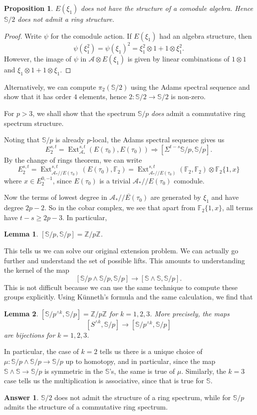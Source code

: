 \documentclass{shortart}
\newtheorem*{prop}{Proposition}
\newtheorem*{lemma}{Lemma}
\theoremstyle{definition}
\newtheorem*{ans}{Answer}
\renewcommand\S{\mathbb{S}}
\newcommand\F{\mathbb{F}}
\newcommand\Z{\mathbb{Z}}
\newcommand\qq{/\!\!/}
\DeclareMathOperator\Ext{Ext}
\begin{document}
\begin{prop}
  $E(\xi_1)$ does not have the structure of a comodule algebra. Hence $\S/2$ does not admit a ring structure.
\end{prop}

\begin{proof}
  Write $\psi$ for the comodule action. If $E(\xi_1)$ had an algebra structure, then
  \[
    \psi(\xi_1^2) = \psi(\xi_1)^2 = \xi_1^2 \otimes 1 + 1 \otimes \xi_1^2.
  \]
  However, the image of $\psi$ in $\mathcal{A} \otimes E(\xi_1)$ is given by linear combinations of $1 \otimes 1$ and $\xi_1 \otimes 1 + 1 \otimes \xi_1$.
\end{proof}

Alternatively, we can compute $\pi_2(\S/2)$ using the Adams spectral sequence and show that it has order $4$ elements, hence $2: \S/2 \to \S/2$ is non-zero.

For $p > 3$, we shall show that the spectrum $\S/p$ \emph{does} admit a commutative ring spectrum structure.

Noting that $\S/p$ is already $p$-local, the Adams spectral sequence gives us
\[
  E_2^{s, t} = \Ext^{s, t}_{\mathcal{A}_*} (E(\tau_0), E(\tau_0)) \Rightarrow [\Sigma^{t - s} \S/p, \S/p].
\]
By the change of rings theorem, we can write
\[
  E_2^{s, t} = \Ext^{s, t}_{\mathcal{A}_*\qq E(\tau_0)} (E(\tau_0), \F_2) = \Ext^{s, t}_{\mathcal{A}_*\qq E(\tau_0)} (\F_2, \F_2) \otimes \F_2\{1, x\}
\]
where $x \in E_2^{0, -1}$, since $E(\tau_0)$ is a trivial $\mathcal{A}_*\qq E(\tau_0)$ comodule.

Now the terms of lowest degree in $\overline{\mathcal{A}_*\qq E(\tau_0)}$ are generated by $\xi_1$ and have degree $2p - 2$. So in the cobar complex, we see that apart from $\F_2\{1, x\}$, all terms have $t - s \geq 2p - 3$. In particular,
\begin{lemma}
  $[\S/p, \S/p] = \Z/p\Z$.\fakeqed
\end{lemma}
This tells us we can solve our original extension problem. We can actually go further and understand the set of possible lifts. This amounts to understanding the kernel of the map
\[
  [\S/p\wedge \S/p, \S/p] \to [\S \wedge \S, \S/p].
\]
This is not difficult because we can use the same technique to compute these groups explicitly. Using K\"unneth's formula and the same calculation, we find that
\begin{lemma}
  $[\S/p^{\wedge k}, \S/p] = \Z/p\Z$ for $k = 1, 2, 3$. More precisely, the maps
  \[
    [S^{\wedge k}, \S/p] \to [\S/p^{\wedge k}, \S/p]
  \]
  are bijections for $k = 1, 2, 3$.\fakeqed
\end{lemma}

In particular, the case of $k = 2$ tells us there is a unique choice of $\mu: \S/p \wedge \S/p \to \S/p$ up to homotopy, and in particular, since the map $\S \wedge \S \to \S/p$ is symmetric in the $\S$'s, the same is true of $\mu$. Similarly, the $k = 3$ case tells us the multiplication is associative, since that is true for $\S$.

\begin{ans}
  $\S/2$ does not admit the structure of a ring spectrum, while for $\S/p$ admits the structure of a commutative ring spectrum.
\end{ans}
\end{document}
